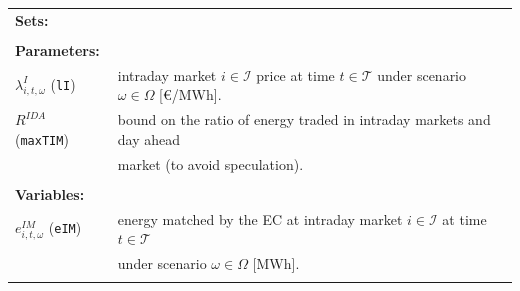 \documentclass{article}
\begin{document}
\begin{tabularx}{\textwidth}{l l}
    \textbf{Sets:} \\
    \\
    
    \textbf{Parameters:} \\
    	$\lambda^I_{i, t, \omega}$ (\verb|lI|) & intraday market $i \in \mathcal{I}$ price at time $t \in \mathcal{T}$ under scenario $\omega \in \Omega$ [\euro/MWh]. \\
	$R^{IDA}$ (\verb|maxTIM|) & bound on the ratio of energy traded in intraday markets and day ahead \\
	& market (to avoid speculation).\\
    \\ 
       
    \textbf{Variables:} \\
    $e^{IM}_{i, t, \omega}$ (\verb|eIM|) & energy matched by the EC at intraday market $i \in \mathcal{I}$ at time $t \in \mathcal{T}$ \\
    & under scenario $\omega \in \Omega$ [MWh]. \\
	\\
\end{tabularx}
\end{document}
